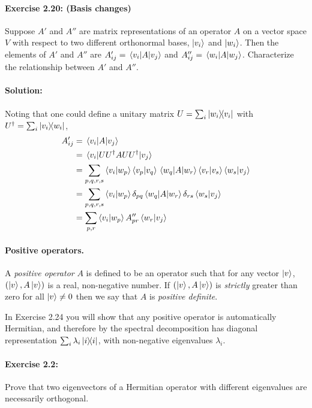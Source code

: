 \documentclass{article}
\begin{document}
\paragraph{\cite{mikeandike} Exercise 2.20: (Basis changes)} Suppose $A'$ and $A''$ are matrix representations of an operator $A$ on a vector space $V$ with respect to two different orthonormal bases, $\ket{v_i}$ and $\ket{w_i}$. Then the elements of $A'$ and $A''$ are $A'_{ij} = \mel{v_i}{A}{v_j}$ and $A''_{ij} = \mel{w_i}{A}{w_j}$. Characterize the relationship between $A'$ and $A''$.

\paragraph{Solution:} Noting that one could define a unitary matrix $U = \sum_i \ketbra{w_i}{v_i}$ with $U^\dagger = \sum_i \ketbra{v_i}{w_i}$, \begin{align*}
  A'_{ij} &= \mel{v_i}{A}{v_j} \\
    &= \mel{v_i}{U U^\dagger A U U^\dagger}{v_j} \\
    &= \sum_{p,q,r,s} \braket{v_i}{w_p} \braket{v_p}{v_q} \mel{w_q}{A}{w_r} \braket{v_r}{v_s} \braket{w_s}{v_j} \\
    &= \sum_{p,q,r,s} \braket{v_i}{w_p} \delta_{pq} \mel{w_q}{A}{w_r} \delta_{rs} \braket{w_s}{v_j} \\
    &= \sum_{p,r} \braket{v_i}{w_p} A''_{pr} \braket{w_r}{v_j} \\
\end{align*}

\paragraph{Positive operators.} A \emph{positive operator} $A$ is defined to be an operator such that for any vector $\ket{v}$, $(\ket{v}, A\ket{v})$ is a real, non-negative number. If $(\ket{v}, A\ket{v})$ is \emph{strictly} greater than zero for all $\ket{v} \neq 0$ then we say that $A$ is \emph{positive definite}.

In Exercise 2.24 you will show that any positive operator is automatically Hermitian, and therefore by the spectral decomposition has diagonal representation $\sum_i \lambda_i \ketbra{i}{i}$, with non-negative eigenvalues $\lambda_i$.

\paragraph{\cite{mikeandike} Exercise 2.2:} Prove that two eigenvectors of a Hermitian operator with different eigenvalues are necessarily orthogonal.
\end{document}
